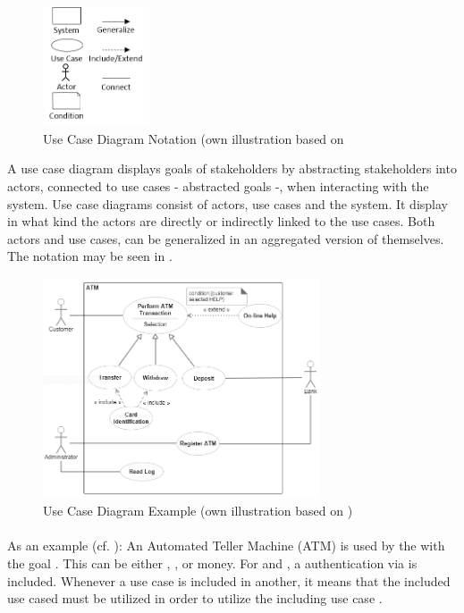 \begin{figure}[H] 
    \centering
    \includegraphics[width=0.28\textwidth]{img/ucSymb.png}
    \caption{Use Case Diagram Notation (own illustration based on \cite[163]{Pohl.2007}}\label{fig:ucSymb}
\end{figure}

A use case diagram displays goals of stakeholders by abstracting stakeholders into actors, connected to use cases - abstracted goals -, when interacting with the system. Use case diagrams consist of actors, use cases and the system. It display in what kind the actors are directly or indirectly linked to the use cases. Both actors and use cases, can be generalized in an aggregated version of themselves. The notation may be seen in .

\begin{figure}[H]
    \centering
    \includegraphics[width=0.73\textwidth]{img/ucEx.png}
    \caption[Use Case Diagram Example]{Use Case Diagram Example (own illustration based on \cite[641-644]{ObjectManagementGroup.01.03.2015})}\label{fig:ucEx}
\end{figure}

\paragraph{} As an example (cf. ): An Automated Teller Machine (ATM) is used by the  with the goal . This can be either , , or  money. For  and , a authentication via  is included. Whenever a use case is included in another, it means that the included use cased must be utilized in order to utilize the including use case \parencite[cf.][639]{ObjectManagementGroup.01.03.2015}. 

